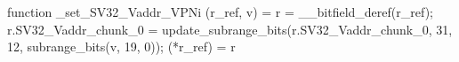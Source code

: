 function _set_SV32_Vaddr_VPNi (r_ref, v) = {
    r = __bitfield_deref(r_ref);
    r.SV32_Vaddr_chunk_0 = update_subrange_bits(r.SV32_Vaddr_chunk_0, 31, 12, subrange_bits(v, 19, 0));
    (*r_ref) = r
}
